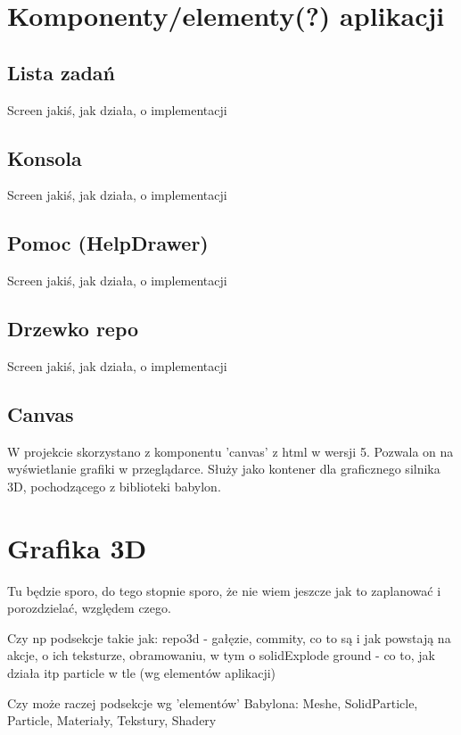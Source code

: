 \documentclass[11pt,a4paper,polish,thesis]{dcsbook}
\begin{document}
	\section{Komponenty/elementy(?) aplikacji}
	
	\subsection{Lista zadań}
	
	Screen jakiś, jak działa, o implementacji
	
	\subsection{Konsola}
	
	Screen jakiś, jak działa, o implementacji
	
	\subsection{Pomoc (HelpDrawer)}
	
	Screen jakiś, jak działa, o implementacji
	
	\subsection{Drzewko repo}
	
	Screen jakiś, jak działa, o implementacji
	
	\subsection{Canvas}
	
	W projekcie skorzystano z komponentu 'canvas' z html w wersji 5. Pozwala on na wyświetlanie grafiki w przeglądarce. Służy jako kontener dla graficznego silnika 3D, pochodzącego z biblioteki babylon. 
	
	\section{Grafika 3D}
	Tu będzie sporo, do tego stopnie sporo, że nie wiem jeszcze jak to zaplanować i porozdzielać, względem czego.
	
	Czy np podsekcje takie jak:
	repo3d - gałęzie, commity, co to są i jak powstają na akcje, o ich teksturze, obramowaniu, w tym o solidExplode
	ground - co to, jak działa itp
	particle w tle
	(wg elementów aplikacji)
	
	Czy może raczej podsekcje wg 'elementów' Babylona:
	Meshe, SolidParticle, Particle, Materiały, Tekstury, Shadery
	
\end{document}
